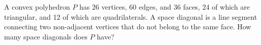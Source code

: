 A convex polyhedron $P$ has 26 vertices, 60 edges, and 36 faces, 24 of which are triangular, and 12 of which are quadrilaterals. A space diagonal is a line segment connecting two non-adjacent vertices that do not belong to the same face. How many space diagonals does $P$ have?